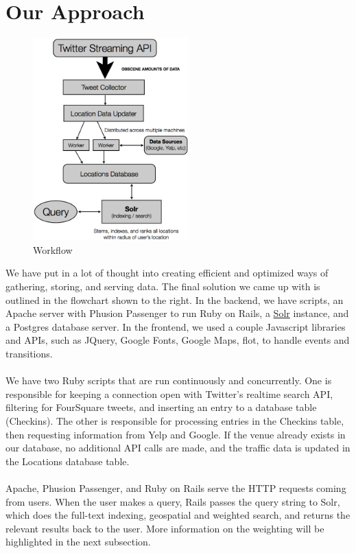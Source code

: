 \documentclass{article}
\begin{document}
\section{Our Approach}
\begin{figure}
\includegraphics[width=6cm]{flowchart.png}
\caption{Workflow}
\end{figure}
We have put in a lot of thought into creating efficient and optimized ways of gathering, storing, and serving data. The final solution
we came up with is outlined in the flowchart shown to the right. In the backend, we have scripts, an Apache server with Phusion Passenger
to run Ruby on Rails, a \href{http://lucene.apache.org/solr/}{Solr} instance, and a Postgres database server. In the frontend, we used
a couple Javascript libraries and APIs, such as JQuery, Google Fonts, Google Maps, flot, to handle events and transitions. 
\\ \\
We have two Ruby scripts that are run continuously and concurrently. One is responsible for keeping a connection open with Twitter's realtime
search API, filtering for FourSquare tweets, and inserting an entry to a database table (Checkins). The other is responsible for processing
entries in the Checkins table, then requesting information from Yelp and Google. If the venue already exists in our database, no additional
API calls are made, and the traffic data is updated in the Locations database table. 
\\ \\


Apache, Phusion Passenger, and Ruby on Rails serve the HTTP requests coming from users. When the user makes a query, Rails passes the query
string to Solr, which does the full-text indexing, geospatial and weighted search, and returns the relevant results back to the user.
More information on the weighting will be highlighted in the next subsection.
\end{document}
